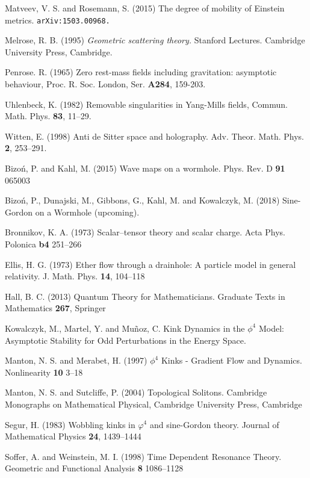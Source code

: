 \begin{thebibliography}{}
 Matveev, V. S. and Rosemann, S. (2015)
The degree of mobility of Einstein metrics.
{\tt arXiv:1503.00968.}


Melrose, R. B. (1995)
{\em Geometric scattering theory.} Stanford Lectures. Cambridge University Press,
Cambridge.

Penrose. R. (1965) Zero rest-mass fields including gravitation: asymptotic behaviour, Proc. R. 
Soc. London, Ser. {\bf A284}, 159-203.

 Uhlenbeck, K. (1982) Removable singularities in Yang-Mills fields,
Commun. Math. Phys. {\bf 83}, 11--29.

 Witten, E. (1998)
Anti de Sitter space and holography. Adv. Theor. Math. Phys. {\bf 2}, 253--291.


 Bizo\'n, P. and Kahl, M. (2015)
Wave maps on a wormhole. Phys. Rev. D {\bf 91} 065003

 Bizo\'n, P., Dunajski, M., Gibbons, G., Kahl, M. and Kowalczyk, M. (2018) Sine-Gordon on a Wormhole (upcoming).

 Bronnikov, K. A. (1973)
Scalar--tensor theory and scalar charge. Acta Phys. Polonica {\bf b4} 251--266

 Ellis, H. G. (1973)
Ether flow through a drainhole: A particle model in general relativity. J. Math. Phys. {\bf 14}, 104--118

 Hall, B. C. (2013)
Quantum Theory for Mathematicians. Graduate Texts in Mathematics {\bf 267}, Springer

 Kowalczyk, M., Martel, Y. and Mu\~noz, C.
Kink Dynamics in the $\phi^4$ Model: Asymptotic Stability for Odd Perturbations in the Energy Space. 

 Manton, N. S. and Merabet, H. (1997)
$\phi^4$ Kinks - Gradient Flow and Dynamics. Nonlinearity {\bf 10} 3--18

 Manton, N. S. and Sutcliffe, P. (2004)
Topological Solitons. Cambridge Monographs on Mathematical Physical, Cambridge University Press, Cambridge

 Segur, H. (1983)
Wobbling kinks in $\varphi^4$ and sine-Gordon theory. Journal of Mathematical Physics {\bf 24}, 1439--1444

 Soffer, A. and Weinstein, M. I. (1998)
Time Dependent Resonance Theory. Geometric and Functional Analysis {\bf 8} 1086--1128


\end{thebibliography}
